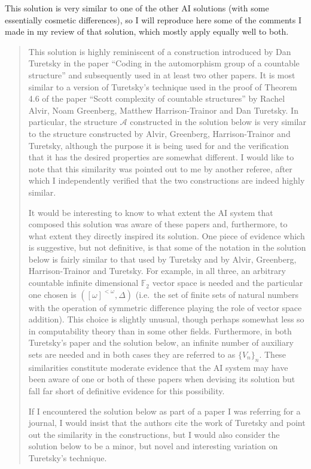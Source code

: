 \documentclass[12pt]{article}
\theoremstyle{definition}
\theoremstyle{remark}
\begin{document}
This solution is very similar to one of the other AI solutions (with some essentially cosmetic differences), so I will reproduce here some of the comments I made in my review of that solution, which mostly apply equally well to both.
\begin{quote}
    This solution is highly reminiscent of a construction introduced by Dan Turetsky in the paper ``Coding in the automorphism group of a countable structure'' and subsequently used in at least two other papers. It is most similar to a version of Turetsky's technique used in the proof of Theorem 4.6 of the paper ``Scott complexity of countable structures'' by Rachel Alvir, Noam Greenberg, Matthew Harrison-Trainor and Dan Turetsky. In particular, the structure $\mathcal{A}$ constructed in the solution below is very similar to the structure constructed by Alvir, Greenberg, Harrison-Trainor and Turetsky, although the purpose it is being used for and the verification that it has the desired properties are somewhat different. I would like to note that this similarity was pointed out to me by another referee, after which I independently verified that the two constructions are indeed highly similar.

    It would be interesting to know to what extent the AI system that composed this solution was aware of these papers and, furthermore, to what extent they directly inspired its solution. One piece of evidence which is suggestive, but not definitive, is that some of the notation in the solution below is fairly similar to that used by Turetsky and by Alvir, Greenberg, Harrison-Trainor and Turetsky. For example, in all three, an arbitrary countable infinite dimensional $\mathbb{F}_2$ vector space is needed and the particular one chosen is $([\omega]^{<\omega}, \Delta)$ (i.e.\ the set of finite sets of natural numbers with the operation of symmetric difference playing the role of vector space addition). This choice is slightly unusual, though perhaps somewhat less so in computability theory than in some other fields. Furthermore, in both Turetsky's paper and the solution below, an infinite number of auxiliary sets are needed and in both cases they are referred to as $\{V_n\}_n$. These similarities constitute moderate evidence that the AI system may have been aware of one or both of these papers when devising its solution but fall far short of definitive evidence for this possibility.

    If I encountered the solution below as part of a paper I was referring for a journal, I would insist that the authors cite the work of Turetsky and point out the similarity in the constructions, but I would also consider the solution below to be a minor, but novel and interesting variation on Turetsky's technique.
\end{quote}
\end{document}
